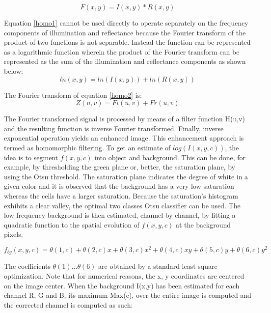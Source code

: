 \documentclass[final,a4paper,12pt,english]{UnicaPhdThesis3}
\begin{document}
{\begin{equation}\label{homo1}
F(x,y) = I(x,y) * R(x,y)
\end{equation}

Equation \ref{homo1} cannot be used directly to operate separately on the frequency components of illumination and reflectance because the Fourier transform of the product of two functions is not separable. Instead the function can be represented as a logarithmic function wherein the product of the Fourier transform can be represented as the sum of the illumination and reflectance components as shown below:
\begin{equation}\label{homo2}
ln(x,y) = ln(I(x,y)) + ln(R(x,y))
\end{equation}

The Fourier transform of equation \ref{homo2} is:
\begin{equation}\label{homo3}
Z(u,v) = Fi(u,v) + Fr(u,v)
\end{equation}

The Fourier transformed signal is processed by means of a filter function H(u,v) and the resulting function is inverse Fourier transformed. Finally, inverse exponential operation yields an enhanced image. This enhancement approach is termed as homomorphic filtering. 
To get an estimate of $log(I(x,y,c))$, the idea is to segment $f(x,y,c)$ into object and background. This can be done, for example, by thresholding the green plane or, better, the saturation plane, by using the Otsu threshold. The saturation plane indicates the degree of white in a given color and it is observed that the background has a very low saturation whereas the cells have a larger saturation. Because the saturation’s histogram exhibits a clear valley, the optimal two classes Otsu classifier can be used.
The low frequency background is then estimated, channel by channel, by fitting a quadratic function to the spatial evolution of $f(x,y,c)$ at the background pixels.

\begin{equation}\label{homo4}
f_{bg}(x,y,c)=\theta(1,c)+\theta(2,c)x+\theta(3,c)x^2 +\theta(4,c)xy+\theta(5,c)y+\theta(6,c)y^2  
\end{equation}

The coefficients $\theta(1) ... \theta(6)$ are obtained by a standard least square optimization. Note that for numerical reasons, the x, y coordinates are centered on the image center.
When the background I(x,y) has been estimated for each channel R, G and B, its maximum Max(c), over the entire image is computed and the corrected channel is computed as such:

}
\end{document}
